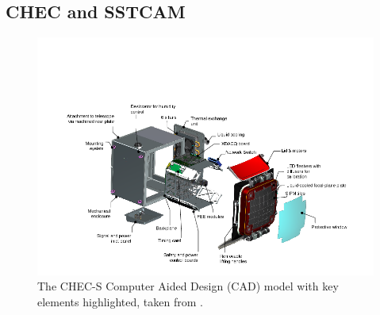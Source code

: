 \subsection{CHEC and SSTCAM}
\begin{figure}[ht] 
        \centering \includegraphics[width=\columnwidth]{figures/cam.png}
        \caption{
                \label{fig:cam} %
                The CHEC-S Computer Aided Design (CAD) model with key elements highlighted, taken from \cite{rwhite}.
        }
\end{figure}
